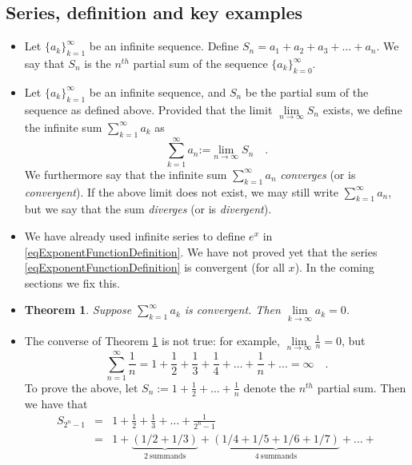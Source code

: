 \documentclass[12pt]{book}
\newcommand{\eqdef}{\textbf{:=}}
\newcommand{\importantFormula}[1]{\begin{equation} \boxed{#1} \end{equation}}
\newtheorem{theorem}{Theorem}[section]
\begin{document}
\subsection{Series, definition and key examples}
\begin{itemize}
\item Let $\{a_k\}_{k=1}^\infty$ be an infinite sequence. Define $S_n= a_1+a_2+a_3+\dots+a_n$. We say that $S_n$ is the $n^{th}$ partial sum of the sequence $\{a_k\}_{k=0}^\infty$.
\item  Let $\{a_k\}_{k=1}^\infty$ be an infinite sequence, and $S_n$ be the partial sum of the sequence as defined above. Provided that the limit $\lim\limits_{n\to\infty} S_n$ exists, we define the infinite sum $\sum\limits_{k=1}^\infty a_k $ as
\importantFormula{
\sum_{k=1}^{\infty}a_n\eqdef \lim\limits_{n\to \infty} S_n\quad .
}
We furthermore say that the infinite sum $\sum\limits_{k=1}^{\infty}a_n$ \emph{converges} (or is \emph{convergent}). If the above limit does not exist, we may still write $\sum\limits_{k=1}^{\infty}a_n$, but we say that the sum \emph{diverges} (or is \emph{divergent}).  
\item We have already used infinite series to define $e^x$ in \eqref{eqExponentFunctionDefinition}. We have not proved yet that the series \eqref{eqExponentFunctionDefinition} is convergent (for all $x$). In the coming sections we fix this.
\item 
\begin{theorem}\label{thSummandsConvergentSeriesTendToZero}
Suppose $\sum\limits_{k=1}^\infty a_k$ is convergent. Then $\lim\limits_{k\to \infty } a_k=0$.
\end{theorem}
\item The converse of Theorem \ref{thSummandsConvergentSeriesTendToZero} is not true: for example, $\lim\limits_{n\to \infty} \frac{1}{n}=0$, but 
\begin{equation}\label{eqHarmonicSeries}
\sum_{n=1}^{\infty}\frac{1}n= 1+\frac{1}2+\frac13+\frac14+\dots +\frac1n+\dots=\infty\quad .
\end{equation}
To prove the above, let $S_n:=1+\frac{1}2+\dots +\frac{1}n$ denote the $n^{th}$ partial sum. Then we have that
\begin{equation*}
\begin{array}{rcl}
S_{2^n-1}&=&1+\frac{1}2+\frac13 +\dots +\frac{1}{2^n-1}\\
&=& 1+ \underbrace{\left(1/2+1/3\right)}_{\mathrm{2~summands}} +\underbrace{(1/4+1/5+1/6+1/7)}_{\mathrm{4~summands}}+\dots +

\end{array}
\end{equation*}
\end{itemize}
\end{document}
